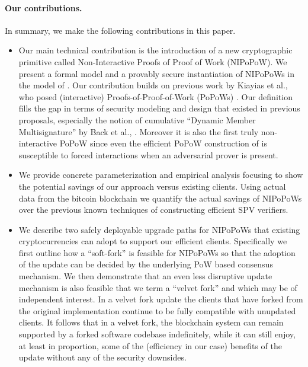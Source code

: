 \paragraph{Our contributions.}
In summary,  we make the following contributions in this paper.
  \begin{itemize}[leftmargin=3.2mm]
    \item Our main technical contribution is the introduction of
    a new cryptographic
     primitive called Non-Interactive Proofs of Proof of Work (NIPoPoW). We present a formal model and a provably secure
     instantiation of NIPoPoWs in the model of \cite{backbone}.
     Our contribution builds on previous work by  Kiayias et al., who posed
     (interactive) Proofs-of-Proof-of-Work (PoPoWs) \cite{KLS}.
     Our definition fills the gap in terms of security modeling and design that
      existed in previous proposals, especially the notion of cumulative
      ``Dynamic Member Multisignature'' by Back et al., \cite{}. Moreover
      it is also the first truly non-interactive PoPoW since even the
      efficient PoPoW construction of \cite{KLS} is susceptible to forced
      interactions when an adversarial prover is present.

  \item We provide concrete parameterization and empirical analysis focusing to show the potential savings of our approach versus existing clients.
Using actual data from the bitcoin blockchain we quantify the actual savings of NIPoPoWs over
the previous known techniques of constructing efficient SPV verifiers.
   \item We describe two safely deployable upgrade paths for NIPoPoWs that existing cryptocurrencies can  adopt to support our efficient clients. Specifically
   we first outline how a ``soft-fork''  is feasible for NIPoPoWs so that the
   adoption of the update can be decided by the underlying PoW based consensus mechanism. We then demonstrate that an even less disruptive update mechanism is also feasible that we term a ``velvet fork'' and which may be of independent interest. In a velvet fork update the clients that have forked from the original implementation continue to be fully compatible with unupdated clients. It follows that in a velvet fork, the blockchain system can remain supported by a forked software codebase indefinitely, while it can still enjoy, at least in proportion, some of the (efficiency in our case) benefits of the update without any of the  security downsides.
  \end{itemize}


